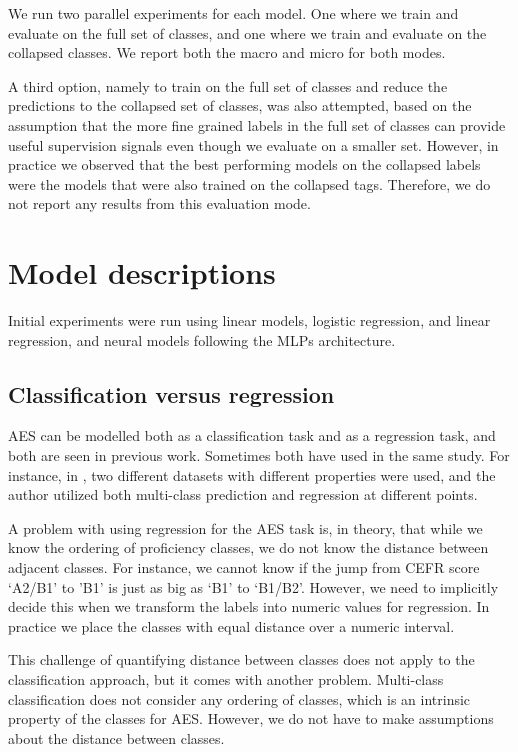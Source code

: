 We run two parallel experiments for each model. One where we train and
evaluate on the full set of classes, and one where we train and evaluate on
the collapsed classes. We report both the macro and micro \FI for both modes.

A third option, namely to train on the full set of classes and reduce the
predictions to the collapsed set of classes, was also attempted, based on the
assumption that the more fine grained labels in the full set of classes can
provide useful supervision signals even though we evaluate on a smaller set.
However, in practice we observed that the best performing models on the
collapsed labels were the models that were also trained on the collapsed
tags. Therefore, we do not report any results from this evaluation mode.


\section{Model descriptions}

Initial experiments were run using linear models, logistic regression,
and linear regression, and neural models following the \acp{MLP} architecture.


\subsection{Classification versus regression}

\ac{AES} can be modelled both as a classification task and as a regression
task, and both are seen in previous work. Sometimes both have used in the
same study. For instance, in \textcite{vajjala17}, two different datasets
with different properties were used, and the author utilized both multi-class
prediction and regression at different points.

A problem with using regression for the AES task is, in theory, that while we
know the ordering of proficiency classes, we do not know the distance between
adjacent classes. For instance, we cannot know if the jump from CEFR score
`A2/B1' to 'B1' is just as big as `B1' to `B1/B2'. However, we need to
implicitly decide this when we transform the labels into numeric values for
regression. In practice we place the classes with equal distance over a
numeric interval.

This challenge of quantifying distance between classes does not apply to the
classification approach, but it comes with another problem. Multi-class
classification does not consider any ordering of classes, which is an
intrinsic property of the classes for AES. However, we do not have to make
assumptions about the distance between classes.

